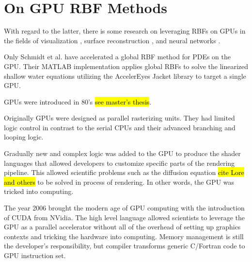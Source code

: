 \documentclass[11pt]{report}
\begin{document}



\section{On GPU RBF Methods}

With regard to the latter, there is some research on leveraging RBFs on GPUs in the fields of visualization \cite{Cuntz2007,Weiler2005},  surface reconstruction \cite{Corrigan2005,Carr2003}, and neural networks \cite{Brandstetter2008}.

  Only Schmidt et al. \cite{Schmidt2009b} have accelerated a global RBF method for PDEs on the GPU. Their MATLAB implementation applies global RBFs to solve the linearized shallow water equations utilizing the AccelerEyes Jacket \cite{JacketGuide2009} library to target a single GPU.


GPUs were introduced in 80's \hl{see master's thesis}.

Originally GPUs were designed as parallel rasterizing units. They had limited logic control in contrast to the serial CPUs and their advanced branching and looping logic. 

Gradually new and complex logic was added to the GPU to produce the shader languages that allowed developers to customize specific parts of the rendering pipeline. This allowed scientific problems such as the diffusion equation \hl{cite Lore and others} to be solved in process of rendering. In other words, the GPU was tricked into computing.

The year 2006 brought the modern age of GPU computing with the introduction of CUDA from NVidia. The high level language allowed scientists to leverage the GPU as a parallel accelerator without all of the overhead of setting up graphics contexts and tricking the hardware into computing. Memory management is still the developer's responsibility, but compiler transforms generic C/Fortran code to GPU instruction set. 
\end{document}
